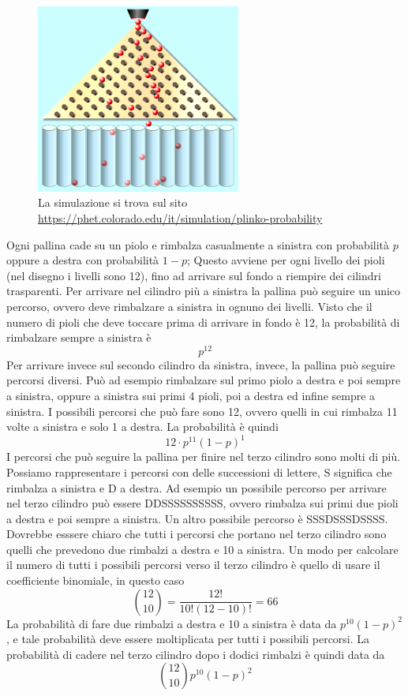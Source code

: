 \begin{figure}
  \begin{center}
    \includegraphics[width=0.6\textwidth]{img/griglia.png}
  \end{center}
  \caption{La simulazione si trova sul sito 
\href{https://phet.colorado.edu/it/simulation/plinko-probability}
     {https://phet.colorado.edu/it/simulation/plinko-probability}}
\end{figure}

Ogni pallina cade su un piolo e rimbalza casualmente a sinistra con 
probabilità $p$ oppure a destra con probabilità $1-p$; Questo avviene per 
ogni livello dei pioli (nel disegno i livelli sono 12), fino ad arrivare sul 
fondo a riempire dei cilindri trasparenti.
Per arrivare nel cilindro più a sinistra la pallina può seguire un unico 
percorso, ovvero deve rimbalzare a sinistra in ognuno dei livelli. 
Visto che il numero di pioli che deve toccare prima di arrivare in fondo è 
12, la probabilità di rimbalzare sempre a sinistra è $$p^{12}$$
Per arrivare invece sul secondo cilindro da sinistra, invece, la pallina può 
seguire percorsi diversi. Può ad esempio rimbalzare sul primo piolo a destra 
e poi sempre a sinistra, oppure a sinistra sui primi 4 pioli, poi a destra ed 
infine sempre a sinistra. I possibili percorsi che può fare sono 12, ovvero 
quelli in cui rimbalza 11 volte a sinistra e solo 1 a destra. La probabilità 
è quindi
$$12 \cdot p^{11}(1-p)^1$$
I percorsi che può seguire la pallina per finire nel terzo cilindro sono 
molti di più. Possiamo rappresentare i percorsi con delle successioni di 
lettere, S significa che rimbalza a sinistra e D a destra. Ad esempio un 
possibile percorso per arrivare nel terzo cilindro può essere
DDSSSSSSSSSS, ovvero rimbalza sui primi due pioli a destra e poi sempre a 
sinistra. Un altro possibile percorso è SSSDSSSDSSSS. Dovrebbe esssere chiaro 
che tutti i percorsi che portano nel terzo cilindro sono quelli che prevedono 
due rimbalzi a destra e 10 a sinistra. Un modo per calcolare il numero di 
tutti i possibili percorsi verso il terzo cilindro è quello di usare il 
coefficiente binomiale, in questo caso
$$ \binom{12}{10}=\dfrac{12!}{10!(12-10)!}=66$$
La probabilità di fare due rimbalzi a destra e 10 a sinistra è data da
$p^{10}(1-p)^2$, e tale probabilità deve essere moltiplicata per tutti i 
possibili percorsi. La probabilità di cadere nel terzo cilindro dopo i dodici 
rimbalzi è quindi data da
$$ \binom{12}{10} p^{10}(1-p)^2$$

